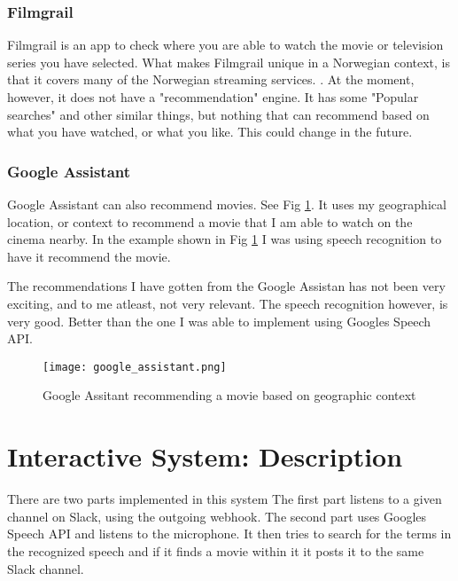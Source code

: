 \documentclass[11pt,fleqn]{book} %
\begin{document}
\subsection{Filmgrail}
Filmgrail is an app to check where you are able to watch the movie or television series you have selected. What makes Filmgrail unique in a Norwegian context, is that it covers many of the Norwegian streaming services. \cite{AmundsenAppenAftenposten}.
At the moment, however, it does not have a "recommendation" engine. It has some "Popular searches" and other similar things, but nothing that can recommend based on what you have watched, or what you like. This could change in the future.
\subsection{Google Assistant}
Google Assistant can also recommend movies. See Fig \ref{fig:google_assistant}. It uses my geographical location, or context to recommend a movie that I am able to watch on the cinema nearby. In the example shown in Fig \ref{fig:google_assistant} I was using speech recognition to have it recommend the movie.

The recommendations I have gotten from the Google Assistan has not been very exciting, and to me atleast, not very relevant. The speech recognition however, is very good. Better than the one I was able to implement using Googles Speech API.

\begin{figure}[]
  \centering
   \texttt{[image: google\_assistant.png]}
  \caption{Google Assitant recommending a movie based on geographic context}
  \label{fig:google_assistant}
\end{figure}



\chapter{Interactive System: Description}
There are two parts implemented in this system
The first part listens to a given channel on Slack, using the outgoing webhook.
\cite{SlackOutgoingSlack}
The second part uses Googles Speech API \cite{GoogleCloudPlatformSpeechPlatform} and listens to the microphone. It then tries to search for the terms in the recognized speech and if it finds a movie within it it posts it to the same Slack channel.
\end{document}
